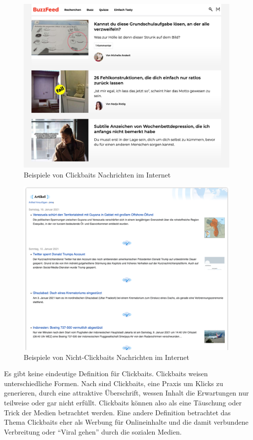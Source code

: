 \begin{figure}[H]
    \centering
    \includegraphics[width=11cm]{kapitel4/buzz.png}
    \caption[Beispiele von Clickbaits]{Beispiele von Clickbaits Nachrichten im Internet}
    \label{clckbPic}
\end{figure}

\begin{figure}[H]
    \centering
    \includegraphics[width=11cm]{kapitel4/wikinews.png}
    \caption[Beispiele von Nicht-Clickbaits]{Beispiele von Nicht-Clickbaits Nachrichten im Internet}
    \label{clckbPic}
\end{figure}

Es gibt keine eindeutige Definition für Clickbaits. Clickbaits weisen unterschiedliche Formen. Nach \cite*{Biyani2016} sind Clickbaits, eine Praxis um Klicks zu generieren, durch eine attraktive Überschrift, wessen Inhalt die Erwartungen nur teilweise oder gar nicht erfüllt. Clickbaits können also als eine Täuschung oder Trick der Medien betrachtet werden. Eine andere Definition \cite*{Potthasta} betrachtet das Thema Clickbaits eher als Werbung für Onlineinhalte und die damit verbundene Verbreitung oder \enquote{Viral gehen} durch die sozialen Medien.

